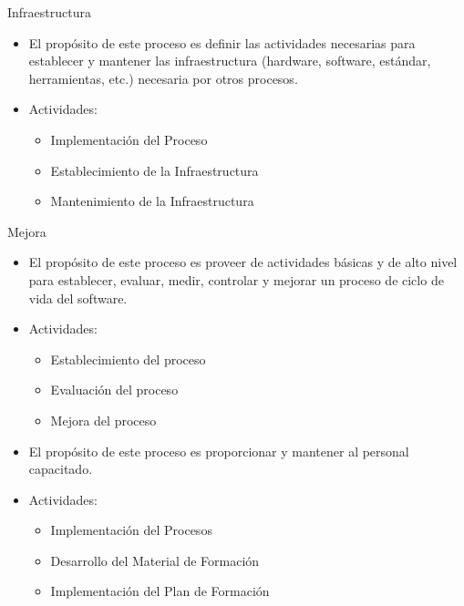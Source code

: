 \documentclass{beamer}
\begin{document}
			\begin{frame}{Infraestructura}
				\begin{itemize}
					\item El propósito de este proceso es definir las actividades necesarias para establecer y mantener las infraestructura (hardware, software, estándar, herramientas, etc.) necesaria por otros procesos.
					\item Actividades:
					
					\begin{itemize}
						\item Implementación del Proceso
						\item Establecimiento de la Infraestructura
						\item Mantenimiento de la Infraestructura
					\end{itemize}

				\end{itemize}
			\end{frame}
			
			\begin{frame}{Mejora}
				\begin{itemize}
					\item El propósito de este proceso es proveer de actividades básicas y de alto nivel para establecer, evaluar, medir, controlar y mejorar un proceso de ciclo de vida del software.
					\item Actividades:
					\begin{itemize}
						\item Establecimiento del proceso
						\item Evaluación del proceso
						\item Mejora del proceso
					\end{itemize}
				\end{itemize}
			\end{frame}
			
			\begin{frame}
				\begin{itemize}
					\item El propósito de este proceso es proporcionar y mantener al personal capacitado.
					\item Actividades:
					\begin{itemize}
						\item Implementación del Procesos
						\item Desarrollo del Material de Formación
						\item Implementación del Plan de Formación 
					\end{itemize} 
				\end{itemize}
			\end{frame}
			
\end{document}
